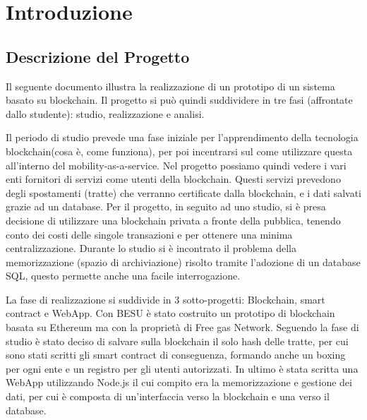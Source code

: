 \documentclass[11pt,a4paper,titlepage]{report}
\begin{document}
\begin{frontespizio}
\end{frontespizio}


\tableofcontents

\chapter{Introduzione}
\section{Descrizione del Progetto}
Il seguente documento illustra la realizzazione di un prototipo di un sistema basato su blockchain. Il progetto si può quindi suddividere in tre fasi (affrontate dallo studente): studio, realizzazione e analisi. 

Il periodo di studio prevede una fase iniziale per l'apprendimento della tecnologia blockchain(cosa è, come funziona), per poi incentrarsi sul come utilizzare questa all'interno del mobility-as-a-service. Nel progetto possiamo quindi vedere i vari enti fornitori di servizi come utenti della blockchain. Questi servizi prevedono degli spostamenti (tratte) che verranno certificate dalla blockchain, e i dati salvati grazie ad un database. Per il progetto, in seguito ad uno studio, si è presa decisione di utilizzare una blockchain privata a fronte della pubblica, tenendo conto dei costi delle singole transazioni e per ottenere una minima centralizzazione.
Durante lo studio si è incontrato il problema della memorizzazione (spazio di archiviazione) risolto tramite l'adozione di un database SQL, questo permette anche una facile interrogazione.

La fase di realizzazione si suddivide in 3 sotto-progetti: Blockchain, smart contract e WebApp.
Con BESU è stato costruito un prototipo di blockchain basata su Ethereum ma con la proprietà di Free gas Network. Seguendo la fase di studio è stato deciso di salvare sulla blockchain il solo hash delle tratte, per cui sono stati scritti gli smart contract di conseguenza, formando anche un boxing per ogni ente e un registro per gli utenti autorizzati.
In ultimo è stata scritta una WebApp utilizzando Node.js il cui compito era la memorizzazione e gestione dei dati, per cui è composta di un'interfaccia verso la blockchain e una verso il database.
\end{document}
